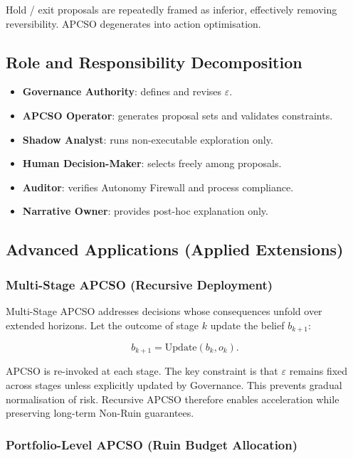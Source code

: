 Hold / exit proposals are repeatedly framed as inferior, effectively
removing reversibility. APCSO degenerates into action optimisation.

\subsection{Role and Responsibility Decomposition}

\begin{itemize}
\item \textbf{Governance Authority}: defines and revises
$\varepsilon$.
\item \textbf{APCSO Operator}: generates proposal sets and validates
constraints.
\item \textbf{Shadow Analyst}: runs non-executable exploration only.
\item \textbf{Human Decision-Maker}: selects freely among proposals.
\item \textbf{Auditor}: verifies Autonomy Firewall and process
compliance.
\item \textbf{Narrative Owner}: provides post-hoc explanation only.
\end{itemize}

\subsection{Advanced Applications (Applied Extensions)}

\subsubsection{Multi-Stage APCSO (Recursive Deployment)}

Multi-Stage APCSO addresses decisions whose consequences unfold over
extended horizons. Let the outcome of stage $k$ update the belief
$b_{k+1}$:

\begin{equation}
b_{k+1} = \mathrm{Update}(b_k, o_k).
\end{equation}

APCSO is re-invoked at each stage. The key constraint is that
$\varepsilon$ remains fixed across stages unless explicitly updated
by Governance. This prevents gradual normalisation of risk. Recursive
APCSO therefore enables acceleration while preserving long-term
Non-Ruin guarantees.

\subsubsection{Portfolio-Level APCSO (Ruin Budget Allocation)}

